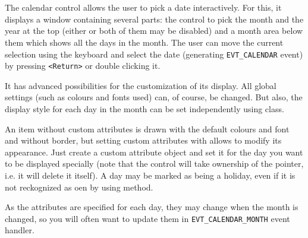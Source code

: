 
\section{}\label{wxcalendarctrl}

The calendar control allows the user to pick a date interactively. For this,
it displays a window containing several parts: the control to pick the month
and the year at the top (either or both of them may be disabled) and a month
area below them which shows all the days in the month. The user can move the
current selection using the keyboard and select the date (generating 
{\tt EVT\_CALENDAR} event) by pressing {\tt <Return>} or double clicking it.

It has advanced possibilities for the customization of its display. All global
settings (such as colours and fonts used) can, of course, be changed. But
also, the display style for each day in the month can be set independently
using  class.

An item without custom attributes is drawn with the default colours and
font and without border, but setting custom attributes with 
 allows to modify its appearance. Just
create a custom attribute object and set it for the day you want to be
displayed specially (note that the control will take ownership of the pointer,
i.e. it will delete it itself). A day may be marked as being a holiday, even
if it is not reckognized as oen by  using 
 method.

As the attributes are specified for each day, they may change when the month
is changed, so you will often want to update them in 
{\tt EVT\_CALENDAR\_MONTH} event handler.


\\
\\
\\

